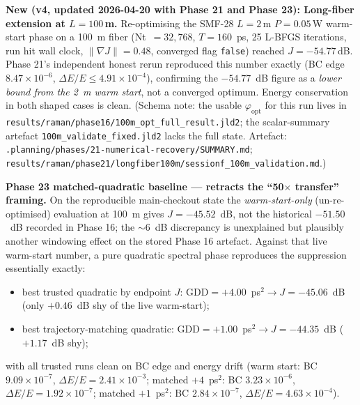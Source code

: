 \documentclass[12pt,a4paper]{article}
\theoremstyle{definition}
\begin{document}
\begin{advisory}
\textbf{New (v4, updated 2026-04-20 with Phase 21 and Phase 23):
Long-fiber extension at $L=100$\,m.} Re-optimising the
SMF-28 $L=2$\,m $P=0.05$\,W warm-start phase on a 100~m fiber
(Nt~$=32{,}768$, $T=160$~ps, 25 L-BFGS iterations, run hit wall clock,
$\lVert\nabla J\rVert = 0.48$, converged flag \texttt{false}) reached
$J = -54.77$\,dB. Phase 21's independent honest rerun reproduced this
number exactly (BC edge $8.47\times10^{-6}$, $\Delta E / E \le
4.91\times10^{-4}$), confirming the $-54.77$~dB figure as a
\emph{lower bound from the 2~m warm start}, not a converged optimum.
Energy conservation in both shaped cases is clean. (Schema note: the
usable $\varphi_\text{opt}$ for this run lives in
\texttt{results/raman/phase16/100m\_opt\_full\_result.jld2}; the
scalar-summary artefact \texttt{100m\_validate\_fixed.jld2} lacks
the full state. Artefact:
\texttt{.planning/phases/21-numerical-recovery/SUMMARY.md};
\texttt{results/raman/phase21/longfiber100m/sessionf\_100m\_validation.md}.)

\textbf{Phase 23 matched-quadratic baseline --- retracts the ``50$\times$
transfer'' framing.} On the reproducible main-checkout state the
\emph{warm-start-only} (un-re-optimised) evaluation at 100~m gives
$J = -45.52$~dB, not the historical $-51.50$~dB recorded in Phase 16;
the $\sim 6$~dB discrepancy is unexplained but plausibly another
windowing effect on the stored Phase 16 artefact. Against that live
warm-start number, a pure quadratic spectral phase reproduces the
suppression essentially exactly:
\begin{itemize}[leftmargin=*,topsep=2pt]
  \item best trusted quadratic by endpoint $J$: $\text{GDD} = +4.00$~ps$^2
    \to J = -45.06$~dB (only $+0.46$~dB shy of the live warm-start);
  \item best trajectory-matching quadratic: $\text{GDD} = +1.00$~ps$^2
    \to J = -44.35$~dB ($+1.17$~dB shy);
\end{itemize}
with all trusted runs clean on BC edge and energy drift (warm
start: BC $9.09\times10^{-7}$, $\Delta E / E = 2.41\times10^{-3}$;
matched $+4$~ps$^2$: BC $3.23\times10^{-6}$, $\Delta E / E =
1.92\times10^{-7}$; matched $+1$~ps$^2$: BC $2.84\times10^{-7}$,
$\Delta E / E = 4.63\times10^{-4}$).


\end{advisory}
\end{document}
